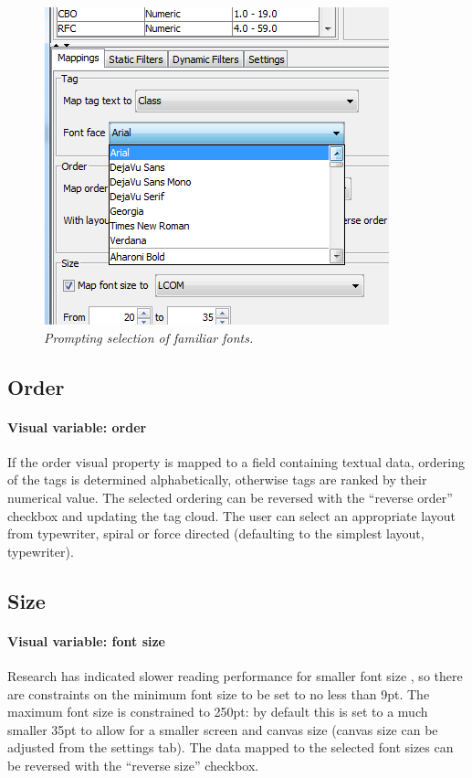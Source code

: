 \begin{figure}[!htb]
  	\centering
   	\includegraphics[scale=0.50]{fontfamily.png}
  	\caption{\textit{Prompting selection of familiar fonts.}}
	\label{fig:fontfamily}
\end{figure}

\subsection{Order}

\paragraph{Visual variable: order} If the order visual property is mapped to a field containing textual data, ordering of the tags is determined alphabetically, otherwise tags are ranked by their numerical value. The selected ordering can be reversed with the ``reverse order'' checkbox and updating the tag cloud. The user can select an appropriate layout from typewriter, spiral or force directed (defaulting to the simplest layout, typewriter).

\subsection{Size}

\paragraph{Visual variable: font size} Research has indicated slower reading performance for smaller font size \citep[pg 107, chap 11:8][]{usability06}, so there are constraints on the minimum font size to be set to no less than 9pt. The maximum font size is constrained to 250pt: by default this is set to a much smaller 35pt to allow for a smaller screen and canvas size (canvas size can be adjusted from the settings tab). The data mapped to the selected font sizes can be reversed with the ``reverse size'' checkbox.

